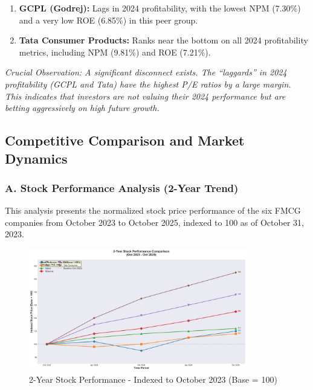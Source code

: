 \documentclass[12pt, a4paper]{report}
\begin{document}
\begin{enumerate}
    \item \textbf{GCPL (Godrej):} Lags in 2024 profitability, with the lowest NPM (7.30\%) and a very low ROE (6.85\%) in this peer group.
    
    \item \textbf{Tata Consumer Products:} Ranks near the bottom on all 2024 profitability metrics, including NPM (9.81\%) and ROE (7.21\%).
\end{enumerate}

\textit{Crucial Observation: A significant disconnect exists. The ``laggards'' in 2024 profitability (GCPL and Tata) have the highest P/E ratios by a large margin. This indicates that investors are not valuing their 2024 performance but are betting aggressively on high future growth.}

\subsection{Competitive Comparison and Market Dynamics}

\subsubsection*{A. Stock Performance Analysis (2-Year Trend)}

This analysis presents the normalized stock price performance of the six FMCG companies from October 2023 to October 2025, indexed to 100 as of October 31, 2023.

\begin{figure}[H]
    \centering
    \includegraphics[width=0.85\textwidth]{assets/industry_profile /stock_performance_chart.png}
    \caption{2-Year Stock Performance - Indexed to October 2023 (Base = 100)}
\end{figure}

\vspace{0.3cm}
\end{document}
